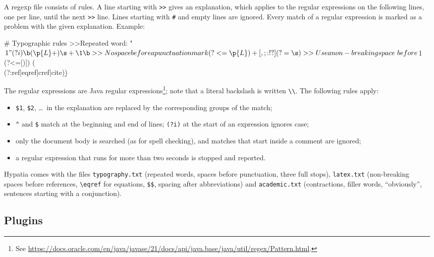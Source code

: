\documentclass[11pt]{article}
\newcommand{\file}[1]{\texttt{#1}}
\begin{document}
    A regexp file consists of rules. A line starting with \verb+>>+ gives an explanation, which applies to the regular expressions on the following lines, one per line, until the next \verb+>>+ line. Lines starting with \verb+#+ and empty lines are ignored. Every match of a regular expression is marked as a problem with the given explanation. Example:
    \begin{Code}
# Typographic rules
>>Repeated word: "$1"
(?i)\b(\p{L}+)\s+\1\b

>>No space before a punctuation mark
(?<=\p{L}) +[,;:!?](?=\s)

>>Use a non-breaking space ~ before $1
(?<=[)]) (\\(?:ref|eqref|cref|cite)\b)
    \end{Code}
    The regular expressions are Java regular expressions\footnote{See \url{https://docs.oracle.com/en/java/javase/21/docs/api/java.base/java/util/regex/Pattern.html}.}; note that a literal backslash is written \verb+\\+. The following rules apply:
    \begin{itemize}
        \itemsep-1mm
        \item \verb+$1+, \verb+$2+, \ldots\ in the explanation are replaced by the corresponding groups of the match;
        \item \verb+^+ and \verb+$+ match at the beginning and end of lines; \verb+(?i)+ at the start of an expression ignores case;
        \item only the document body is searched (as for spell checking), and matches that start inside a comment are ignored;
        \item a regular expression that runs for more than two seconds is stopped and reported.
    \end{itemize}
    Hypatia comes with the files \file{typography.txt} (repeated words, spaces before punctuation, three full stops), \file{latex.txt} (non-breaking spaces before references, \verb+\eqref+ for equations, \verb+$$+, spacing after abbreviations) and \file{academic.txt} (contractions, filler words, ``obviously'', sentences starting with a conjunction).

    \subsection{Plugins}
\end{document}
